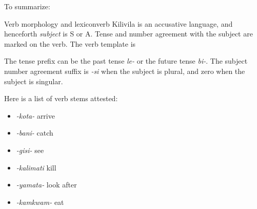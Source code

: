 \documentclass{article}
\newcommand*{\term}[1]{\emph{#1}}
\newcommand*{\corpus}[1]{\emph{#1}}
\begin{document}
To summarize:
\begin{infobox}{Verb morphology and lexicon}{verb}
    Kilivila is an accusative language, and henceforth \term{subject} is S or A.
    Tense and number agreement with the subject are marked on the verb.
    The verb template is 
    \begin{center}
    \end{center}
    The tense prefix can be the past tense \corpus{le-} or the future tense \corpus{bi-}.
    The subject number agreement suffix is 
    \corpus{-si} when the subject is plural,
    and zero when the subject is singular.

    Here is a list of verb stems attested:
    \begin{multicols}{2}     
        \begin{itemize}
            \item \corpus{-kota-} arrive
            \item \corpus{-bani-} catch
            \item \corpus{-gisi-} see 
            \item \corpus{-kalimati} kill
            \item \corpus{-yamata-} look after
            \item \corpus{-kamkwam-} eat
        \end{itemize}
    \end{multicols}
\end{infobox}
\end{document}
